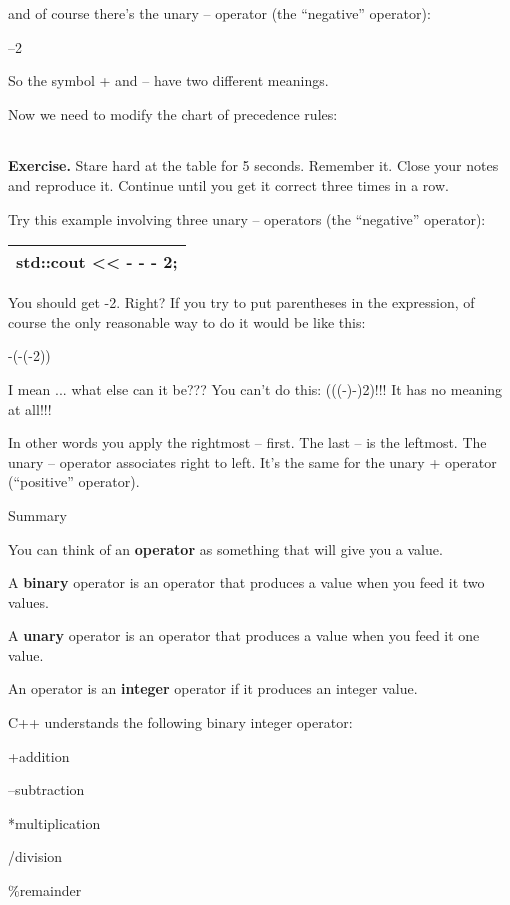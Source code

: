 \documentclass[
]{article}
\begin{document}
and of course there's the unary -- operator (the ``negative'' operator):

--2

So the symbol + and -- have two different meanings.

Now we need to modify the chart of precedence rules:

\begin{longtable}[]{@{}@{}}
\toprule
\endhead
\bottomrule
\end{longtable}

\textbf{Exercise.} Stare hard at the table for 5 seconds. Remember it.
Close your notes and reproduce it. Continue until you get it correct
three times in a row.

Try this example involving three unary -- operators (the ``negative''
operator):

\begin{longtable}[]{@{}l@{}}
\toprule
\endhead
std::cout \textless\textless{} - - - 2;\tabularnewline
\bottomrule
\end{longtable}

You should get -2. Right? If you try to put parentheses in the
expression, of course the only reasonable way to do it would be like
this:

-(-(-2))

I mean ... what else can it be??? You can't do this: (((-)-)2)!!! It has
no meaning at all!!!

In other words you apply the rightmost -- first. The last -- is the
leftmost. The unary -- operator associates right to left. It's the same
for the unary + operator (``positive'' operator).

Summary

You can think of an \textbf{operator} as something that will give you a
value.

A \textbf{binary} operator is an operator that produces a value when you
feed it two values.

A \textbf{unary} operator is an operator that produces a value when you
feed it one value.

An operator is an \textbf{integer} operator if it produces an integer
value.

C++ understands the following binary integer operator:

+addition

--subtraction

*multiplication

/division

\%remainder
\end{document}
